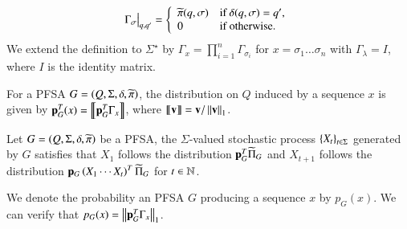 \documentclass[9pt,journal]{IEEEtran}
\begin{document}
{\begin{defn}
\begin{gather}
       \Gamma_\sigma\big|_{q, q'} = \left\{
         \begin{array}{ll}
           \widetilde{\pi}(q, \sigma) & \textrm{if } \delta(q, \sigma) = q',\\
           0 & \textrm{if otherwise}.
         \end{array}\right.
     \end{gather}%
     We extend the definition to $\Sigma^{\star}$ by $\Gamma_x=\prod^{n}_{i=1}\Gamma_{\sigma_i}$ for $x = \sigma_1\dots \sigma_n$ with $\Gamma_{\lambda} = I$, where $I$ is the identity matrix.
   \end{defn}
   \begin{defn}
     \label{defn:InducedDistr}
     For a PFSA $G = \left( Q, \Sigma, \delta, \widetilde{\pi} \right)$, the distribution on $Q$ induced by a sequence $x$ is given by $\mathbf{p}^{T}_{G}(x) = \left\llbracket{\mathbf{p}_G^{T}\Gamma_{x}}\right\rrbracket$, where $\left\llbracket{\mathbf{v}}\right\rrbracket = \mathbf{v}/\left\Vert \mathbf{v} \right\Vert_1$. 
   \end{defn}
   \begin{defn}
     \label{defn:StochasticpocessOfPFSA}
     Let $G=\left( Q, \Sigma, \delta, \widetilde{\pi} \right)$ be a PFSA, the $\Sigma$-valued stochastic process $\left\{ X_t \right\}_{t\in\Sigma}$ generated by $G$ satisfies that $X_1$ follows the distribution $\mathbf{p}_G^T\widetilde{\Pi}_{G}$ and $X_{t+1}$ follows the distribution $\mathbf{p}_{G}\left( X_{1}\cdots X_{t} \right)^T\widetilde{\Pi}_{G}$ for $t\in\mathbb{N}$.
   \end{defn}
   We denote the probability an PFSA $G$ producing a sequence $x$ by $p_{G}(x)$. We can verify that $p_{G}(x) = \left\Vert \mathbf{p}_{G}^T\Gamma_x \right\Vert_1$.


}
\end{document}
